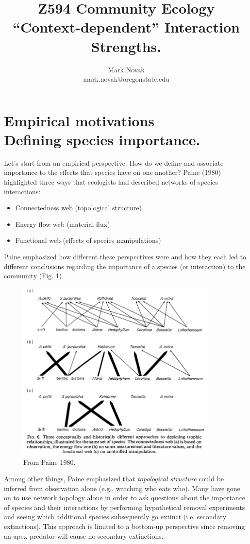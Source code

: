 \documentclass[10pt,letterpaper]{article}
\title{Z594 Community Ecology\\``Context-dependent'' Interaction Strengths.}
\author{Mark Novak\\mark.novak@oregonstate.edu}
\begin{document}
\maketitle
\section{Empirical motivations \\ Defining species importance.}
\label{EmpMot}
Let's start from an empirical perspective.  How do we define and associate importance to the effects that species have on one another?  Paine (1980) highlighted three ways that ecologists had described networks of species interactions:
\begin{itemize}
\item Connectedness web (topological structure)
\item Energy flow web (material flux)
\item Functional web (effects of species manipulations)
\end{itemize}

\noindent
Paine emphasized how different these perspectives were and how they each led to different conclusions regarding the importance of a species (or interaction) to the community (Fig. \ref{fig:PaineFig}).

\begin{figure}[ht!]
\centering
\includegraphics[width=100mm]{figs/Paine1980_Fig6.png}
	\caption{From Paine 1980.}
	\label{fig:PaineFig}

\end{figure}

Among other things, Paine emphasized that \emph{topological structure} could be inferred from observation alone (e.g., watching who eats who).  Many have gone on to use network topology alone in order to ask questions about the importance of species and their interactions by performing hypothetical removal experiments and seeing which additional species subsequently go extinct (i.e. secondary extinctions).  This approach is limited to a bottom-up perspective since removing an apex predator will cause no secondary extinctions.
\end{document}
